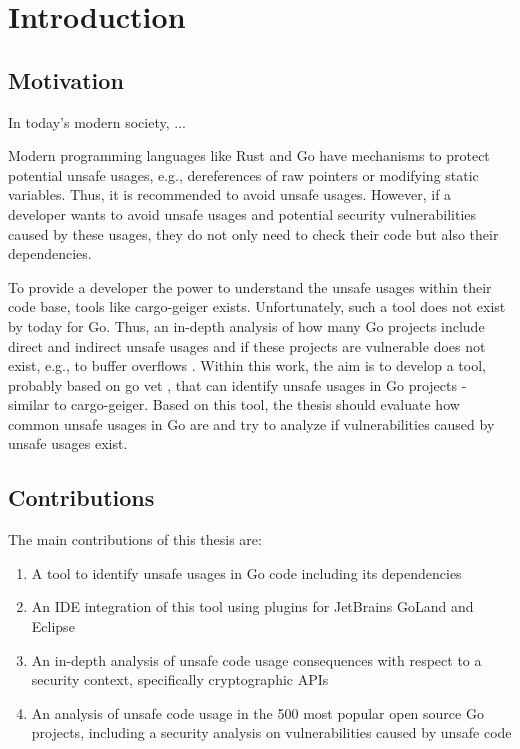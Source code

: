 
\chapter{Introduction}\label{ch:introduction}



\section{Motivation}\label{sec:motivation}

In today's modern society, ...

Modern programming languages like Rust and Go have mechanisms to protect potential
unsafe usages, e.g., dereferences of raw pointers or modifying static variables. Thus, it is
recommended to avoid unsafe usages. However, if a developer wants to avoid unsafe
usages and potential security vulnerabilities caused by these usages, they do not only need
to check their code but also their dependencies.

To provide a developer the power to understand the unsafe usages within their code base,
tools like cargo-geiger \cite{CargoGeiger} exists. Unfortunately, such a tool does not exist by today for Go.
Thus, an in-depth analysis of how many Go projects include direct and indirect unsafe
usages and if these projects are vulnerable does not exist, e.g., to buffer overflows 
\cite{larochelle2001, alnaeli2017, wang2020}.
Within this work, the aim is to develop a tool, probably based on go vet \cite{GoVet}, that can identify
unsafe usages in Go projects - similar to cargo-geiger. Based on this tool, the thesis should
evaluate how common unsafe usages in Go are and try to analyze if vulnerabilities caused
by unsafe usages exist.





\section{Contributions}\label{sec:contributions}

The main contributions of this thesis are:

\begin{enumerate}
  \item A tool to identify unsafe usages in Go code including its dependencies
  \item An IDE integration of this tool using plugins for JetBrains GoLand and Eclipse
  \item An in-depth analysis of unsafe code usage consequences with respect to a security
        context, specifically cryptographic APIs
  \item An analysis of unsafe code usage in the 500 most popular open source Go projects,
        including a security analysis on vulnerabilities caused by unsafe code
\end{enumerate}



